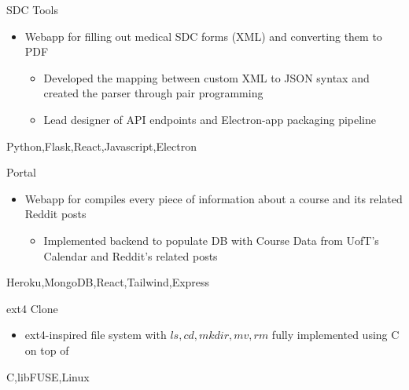 %
%
%


\begin{projects}
	\project
	{SDC Tools}{ }
	{}
	{\begin{itemize}
        \item{Webapp for filling out medical SDC forms (XML) and converting them to PDF}
        \begin{itemize}
            \item{Developed the mapping between custom XML to JSON syntax and created the parser through pair programming}
            \item{Lead designer of API endpoints and Electron-app packaging pipeline}
        \end{itemize}   
      \end{itemize}
    }
	{Python,Flask,React,Javascript,Electron}

	\project
	{Portal}{ }
	{ }
	{\begin{itemize}
        \item{Webapp for compiles every piece of information about a course and its related Reddit posts}
        \begin{itemize}
            \item{Implemented backend to populate DB with Course Data from UofT's Calendar and Reddit's related posts}
        \end{itemize}   
      \end{itemize}
    }
    {Heroku,MongoDB,React,Tailwind,Express}

    \project
	{ext4 Clone}{ }
	{}
	{\begin{itemize}
        \item{ext4-inspired file system with $ls,cd,mkdir,mv,rm$ fully implemented using C on top of }
      \end{itemize}   
    }
	{C,libFUSE,Linux}
				


\end{projects}
